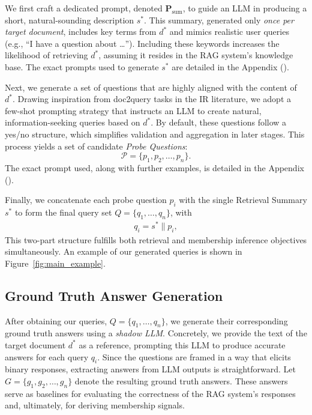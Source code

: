 We first craft a dedicated prompt, denoted $\mathbf{P}_{\mathrm{sum}}$, to guide an LLM in producing a short, natural-sounding description $s^*$. This summary, generated only \emph{once per target document}, includes key terms from $d^*$ and mimics realistic user queries (e.g., “I have a question about \ldots”). Including these keywords increases the likelihood of retrieving $d^*$, assuming it resides in the RAG system’s knowledge base.
The exact prompts used to generate $s^*$ are detailed in the Appendix ().

Next, we generate a set of questions that are highly aligned with the content of $d^*$. Drawing inspiration from doc2query tasks in the IR literature, we adopt a few-shot prompting strategy \citep{dai2023promptagator} that instructs an LLM to create natural, information-seeking queries based on $d^*$.  By default, these questions follow a yes/no structure, which simplifies validation and aggregation in later stages. This process yields a set of candidate \emph{Probe Questions}:
\[
\mathcal{P} = \{p_1, p_2, \ldots, p_n\}.
\]
The exact prompt used, along with further examples, is detailed in the Appendix ().

Finally, we concatenate each probe question $p_i$ with the single Retrieval Summary $s^*$ to form the final query set $Q = \{q_1, \ldots, q_n\}$, with
\begin{align}
    q_i = s^*\| p_i,
\end{align}
This two-part structure fulfills both retrieval and membership inference objectives simultaneously. An example of our generated queries is shown in Figure~\ref{fig:main_example}.






\subsection{Ground Truth Answer Generation}
\label{sec:ground_truth}

After obtaining our queries, $Q=\{q_1, \ldots, q_n\}$, we generate their corresponding ground truth answers using a \emph{shadow LLM}. Concretely, we provide the text of the target document $d^*$ as a reference, prompting this LLM to produce accurate answers for each query $q_i$. Since the questions are framed in a way that elicits binary responses, extracting answers from LLM outputs is straightforward.
Let $G=\{g_1, g_2, \ldots, g_n\}$ denote the resulting ground truth answers. These answers serve as baselines for evaluating the correctness of the RAG system’s responses and, ultimately, for deriving membership signals.

